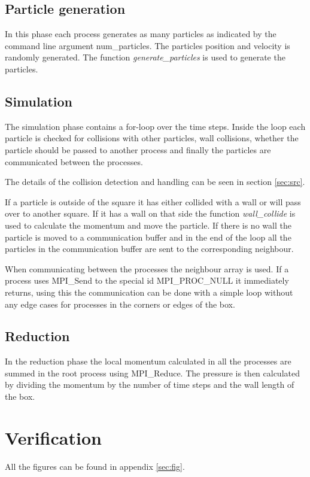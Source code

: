 \documentclass[a4paper, 12pt]{article}
\begin{document}
\subsection{Particle generation}
In this phase each process generates as many particles as indicated by the
command line argument num\_particles. The particles position and velocity is
randomly generated. The function \textit{generate\_particles} is used to generate
the particles.
\subsection{Simulation}
The simulation phase contains a for-loop over the time steps. Inside the loop
each particle is checked for collisions with other particles, wall collisions,
whether the particle should be passed to another process and finally the
particles are communicated between the processes.

The details of the collision detection and handling can be seen in section
\ref{sec:src}.

If a particle is outside of the square it has either collided with a wall or
will pass over to another square. If it has a wall on that side the function
\textit{wall\_collide} is used to calculate the momentum and move the particle.
If there is no wall the particle is moved to a communication buffer and in the
end of the loop all the particles in the communication buffer are sent to the
corresponding neighbour.

When communicating between the processes the neighbour array is used. If a
process uses MPI\_Send to the special id MPI\_PROC\_NULL it immediately returns,
using this the communication can be done with a simple loop without any edge cases
for processes in the corners or edges of the box.

\subsection{Reduction}
In the reduction phase the local momentum calculated in all the processes are
summed in the root process using MPI\_Reduce. The pressure is then calculated
by dividing the momentum by the number of time steps and the wall length of the
box.

\section{Verification}
All the figures can be found in appendix \ref{sec:fig}.
\end{document}

